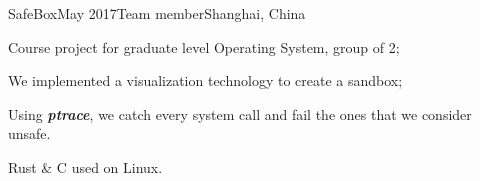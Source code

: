 \ifx\lang\eng
	\begin{rSubsection}{SafeBox}{May 2017}{Team member}{Shanghai, China}
		\item Course project for graduate level Operating System, group of 2;
		\item We implemented a visualization technology to create a sandbox;
		\item Using \textit{\textbf{ptrace}}, we catch every system call and fail the ones that we consider unsafe.
		\item Rust \& C used on Linux.
	\end{rSubsection}
\fi